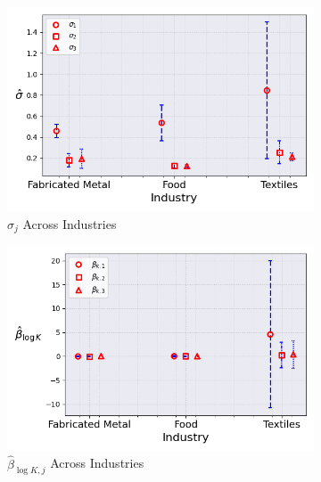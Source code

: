 \documentclass{article}
\begin{document}
\begin{figure}[ht!]
    \begin{subfigure}[t]{0.32\textwidth}
        \centering
        \includegraphics[width=\textwidth]{figure/stationary_normal_kmshare_ciiu_sigma_across_industries_m3.png}
        \caption{$\hat\sigma_j$ Across Industries}
    \end{subfigure}
    \begin{subfigure}[t]{0.32\textwidth}
        \centering
        \includegraphics[width=\textwidth]{figure/stationary_normal_kmshare_ciiu_beta_k_across_industries_m3.png}
        \caption{$\hat{\beta}_{\log K, j}$ Across Industries}
    \end{subfigure}
    \begin{subfigure}[t]{0.32\textwidth}
        \centering

\end{subfigure}
\end{figure}
\end{document}
